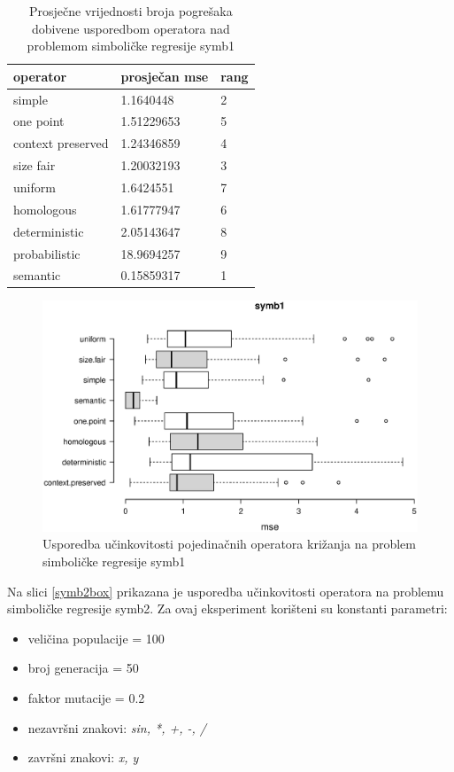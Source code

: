 \begin{table}[H]
 	\centering

    \begin{tabular}{| l | l | l |}
    \hline
    \textbf{operator} & \textbf{prosječan mse} & \textbf{rang}\\ \hline
    simple & 1.1640448 & 2\\ \hline
    one point & 1.51229653 & 5\\ \hline
    context preserved & 1.24346859 & 4\\ \hline
    size fair & 1.20032193 & 3\\ \hline
    uniform & 1.6424551 & 7\\ \hline
    homologous & 1.61777947 & 6\\ \hline
    deterministic & 2.05143647 & 8\\ \hline
    probabilistic & 18.9694257 & 9\\ \hline
    semantic & 0.15859317 & 1\\ \hline
    \end{tabular}
    
    \caption{Prosječne vrijednosti broja pogrešaka dobivene usporedbom operatora nad problemom simboličke regresije symb1}
    \label{symb1table}
\end{table}

\begin{figure}[H]
	\centering
	\includegraphics[trim=0cm 4cm 0cm 0cm, scale=0.6]{./slike/boxPlots/symb1.eps}
	\caption{Usporedba učinkovitosti pojedinačnih operatora križanja na problem simboličke regresije symb1}
	\label{symb1box}
\end{figure}



Na slici \ref{symb2box} prikazana je usporedba učinkovitosti operatora na problemu simboličke regresije symb2. Za ovaj eksperiment korišteni su konstanti parametri:
\begin{itemize}
\item{veličina populacije = 100}
\item{broj generacija = 50}
\item{faktor mutacije = 0.2}
\item{nezavršni znakovi: \textit{sin, *, +, -, /}}
\item{završni znakovi: \textit{x, y}}
\end{itemize} 


